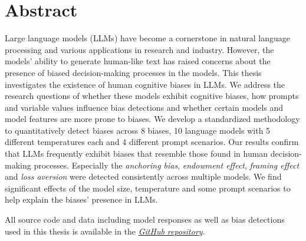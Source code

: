 \section*{Abstract}
\par Large language models (LLMs) have become a cornerstone in natural language processing and various applications in research and industry. However, the models' ability to generate human-like text has raised concerns about the presence of biased decision-making processes in the models. This thesis investigates the existence of human cognitive biases in LLMs. We address the research questions of whether these models exhibit cognitive biases, how prompts and variable values influence bias detections and whether certain models and model features are more prone to biases. We develop a standardized methodology to quantitatively detect biases across 8 biases, 10 language models with 5 different temperatures each and 4 different prompt scenarios. Our results confirm that LLMs frequently exhibit biases that resemble those found in human decision-making processes. Especially the \textit{anchoring bias}, \textit{endowment effect}, \textit{framing effect} and \textit{loss aversion} were detected consistently across multiple models. We find significant effects of the model size, temperature and some prompt scenarios to help explain the biases' presence in LLMs.

\vfill
\begin{flushbottom}
\par All source code and data including model responses as well as bias detections used in this thesis is available in the 
\href{https://github.com/maxjmohr/MSc_04_Master_Thesis}{\textit{GitHub repository}}.
\end{flushbottom}
